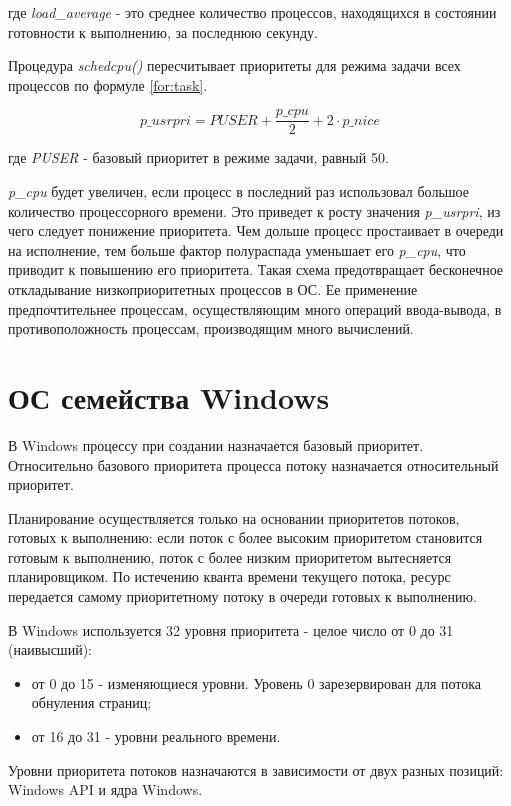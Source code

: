 где \textit{load\_average} - это среднее количество процессов, находящихся в состоянии готовности к выполнению, за последнюю секунду.

Процедура \textit{schedcpu()} пересчитывает приоритеты для режима задачи всех процессов по формуле \eqref{for:task}.

\begin{equation}
    \label{for:task}
    p\_usrpri = PUSER + \frac{p\_cpu}{2} + 2 \cdot p\_nice
\end{equation}

где \textit{PUSER} - базовый приоритет в режиме задачи, равный 50.

\textit{p\_cpu} будет увеличен, если процесс в последний раз использовал большое количество процессорного времени. Это приведет к росту значения \textit{p\_usrpri}, из чего следует понижение приоритета. Чем дольше процесс простаивает в очереди на исполнение, тем больше фактор
полураспада уменьшает его \textit{p\_cpu}, что приводит к повышению его приоритета. Такая схема предотвращает бесконечное откладывание низкоприоритетных процессов в ОС. Ее применение предпочтительнее процессам, осуществляющим много операций ввода-вывода, в противоположность процессам, производящим много вычислений.


\section{ОС семейства Windows}

В Windows процессу при создании назначается базовый приоритет. Относительно базового приоритета процесса потоку назначается относительный приоритет. 

Планирование осуществляется только на основании приоритетов потоков, готовых к выполнению: если поток с более высоким приоритетом становится готовым к выполнению, поток с более низким приоритетом вытесняется планировщиком. По истечению кванта времени текущего потока, ресурс передается самому приоритетному потоку в очереди готовых к выполнению.

В Windows используется 32 уровня приоритета - целое число от 0 до 31 (наивысший):
\begin{itemize}
    \item от 0 до 15 - изменяющиеся уровни. Уровень 0 зарезервирован для потока обнуления страниц;
    \item от 16 до 31 - уровни реального времени.
\end{itemize}

Уровни приоритета потоков назначаются в зависимости от двух разных позиций: Windows API и ядра Windows.

